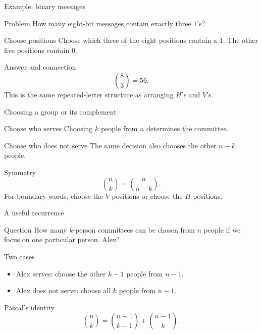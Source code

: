\documentclass{beamer}
\begin{document}
\begin{frame}{Example: binary messages}
\footnotesize
  \begin{block}{Problem}
    How many eight-bit messages contain exactly three $1$'s?
  \end{block}
\pause
  \begin{block}{Choose positions}
    Choose which three of the eight positions contain a $1$.
    The other five positions contain $0$.
  \end{block}
\pause
  \begin{block}{Answer and connection}
    \[
       \binom{8}{3}=56.
    \]
    This is the same repeated-letter structure as arranging $H$'s and $V$'s.
  \end{block}
\end{frame}

\begin{frame}{Choosing a group or its complement}
\small
  \begin{block}{Choose who serves}
    Choosing $k$ people from $n$ determines the committee.
  \end{block}
\pause
  \begin{block}{Choose who does not serve}
    The same decision also chooses the other $n-k$ people.
  \end{block}
\pause
  \begin{block}{Symmetry}
    \[
       \boxed{\binom{n}{k}=\binom{n}{n-k}}.
    \]
    For boundary words, choose the $V$ positions or choose the $H$ positions.
  \end{block}
\end{frame}

\begin{frame}{A useful recurrence}
\small
  \begin{block}{Question}
    How many $k$-person committees can be chosen from $n$ people if we focus
    on one particular person, Alex?
  \end{block}
\pause
  \begin{block}{Two cases}
    \begin{itemize}
      \item Alex serves: choose the other $k-1$ people from $n-1$.
\pause
      \item Alex does not serve: choose all $k$ people from $n-1$.
    \end{itemize}
  \end{block}
\pause
  \begin{block}{Pascal's identity}
    \[
       \boxed{\binom{n}{k}=\binom{n-1}{k-1}+\binom{n-1}{k}}.
    \]
  \end{block}
\end{frame}
\end{document}
